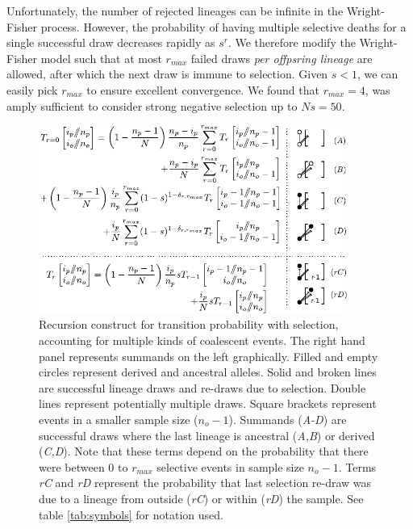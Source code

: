 \documentclass[review]{elsarticle}
\begin{document}
Unfortunately, the number of rejected lineages can be infinite in the Wright-Fisher process.
However, the probability of having multiple selective deaths for a single successful draw decreases
rapidly as $s^r.$ We therefore modify the Wright-Fisher model such that at most $r_{max}$ failed
draws \emph{per offpsring lineage} are allowed, after which the next draw is immune to selection. Given
$s<1$, we can easily pick $r_{max}$ to ensure excellent convergence. We found that $r_{max}=4$, was
amply sufficient to consider strong negative selection up to $Ns=50$.

\begin{figure}
  \centering
  \includegraphics[width=0.9\textwidth]{fig/recurrence-selection-dynamic-failures-annotated.pdf}

  \caption{Recursion construct for transition probability with selection, accounting for multiple
    kinds of coalescent events. The right hand panel represents summands on the left graphically.
    Filled and empty circles represent derived and ancestral alleles. Solid and broken lines are
    successful lineage draws and re-draws due to selection. Double lines represent potentially
    multiple draws. Square brackets represent events in a smaller sample size ($n_o-1$). Summands
    (\textit{A-D}) are successful draws where the last lineage is ancestral (\textit{A,B}) or
    derived (\textit{C,D}). Note that these terms depend on the probability that there were between
    $0$ to $r_{max}$ selective events in sample size $n_o-1$. Terms \textit{rC} and \textit{rD}
    represent the probability that last selection re-draw was due to a lineage from outside
    (\textit{rC}) or within (\textit{rD}) the sample. See table \ref{tab:symbols} for notation used.
  }

  \label{fig:rec-selection-dynamic-fail}
\end{figure}
 
\end{document}

